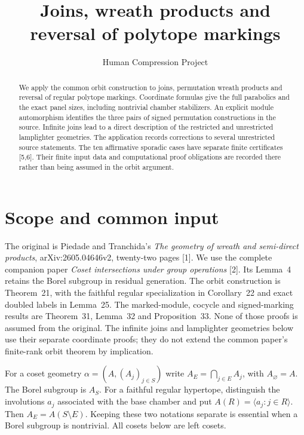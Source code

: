 
\title{Joins, wreath products and reversal of polytope markings}
\author{Human Compression Project}\date{}
\maketitle
\begin{abstract}
We apply the common orbit construction to joins, permutation wreath products
and reversal of regular polytope markings. Coordinate formulas give the full
parabolics and the exact panel sizes, including nontrivial chamber
stabilizers. An explicit module automorphism identifies the three pairs of
signed permutation constructions in the source. Infinite joins lead to a
direct description of the restricted and unrestricted lamplighter geometries.
The application records corrections to several unrestricted source statements.
The ten affirmative sporadic cases have separate finite certificates [5,6].
Their finite input data and computational proof obligations are recorded
there rather than being assumed in the orbit argument.
\end{abstract}

\section{Scope and common input}
The original is Piedade and Tranchida's \emph{The geometry of wreath and
semi-direct products}, arXiv:2605.04646v2, twenty-two pages [1]. We use
the complete companion paper \emph{Coset intersections under group
operations} [2]. Its Lemma~4 retains the Borel subgroup in residual
generation. The orbit construction is Theorem~21, with the faithful
regular specialization in Corollary~22 and exact doubled labels in
Lemma~25. The marked-module, cocycle and signed-marking results are
Theorem~31, Lemma~32 and Proposition~33. None of those proofs is assumed
from the original. The infinite joins and lamplighter geometries below
use their separate coordinate proofs; they do not extend the common
paper's finite-rank orbit theorem by implication.

For a coset geometry $\alpha=(A,(A_j)_{j\in S})$ write
$A_E=\bigcap_{j\in E}A_j$, with $A_\varnothing=A$. The Borel subgroup
is $A_S$. For a faithful regular hypertope, distinguish the involutions
$a_j$ associated with the base chamber and put
$A(R)=\langle a_j:j\in R\rangle$. Then $A_E=A(S\setminus E)$.
Keeping these two notations separate is essential when a Borel subgroup
is nontrivial. All cosets below are left cosets.

